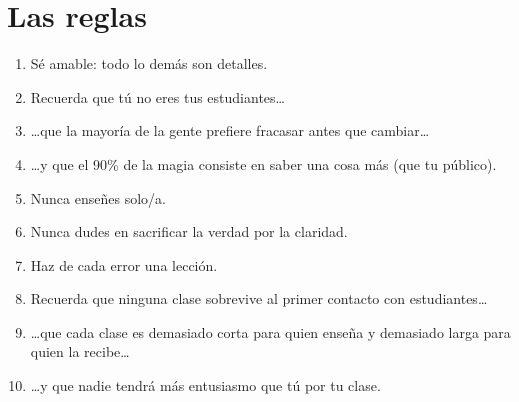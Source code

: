 \chapter*{Las reglas}

\begin{enumerate}

\item Sé amable: todo lo demás son detalles.\\

\item Recuerda que tú no eres tus estudiantes{\ldots}\\

\item {\ldots}que la mayoría de la gente prefiere fracasar antes que cambiar{\ldots}\\

\item {\ldots}y que el 90\% de la magia consiste en saber una cosa más (que tu público).\\

\item Nunca enseñes solo/a.\\

\item Nunca dudes en sacrificar la verdad por la claridad.\\

\item Haz de cada error una lección.\\

\item Recuerda que ninguna clase sobrevive al primer contacto con estudiantes{\ldots}\\

\item {\ldots}que cada clase es demasiado corta para quien enseña y demasiado larga para quien la recibe{\ldots}\\

\item {\ldots}y que nadie tendrá más entusiasmo que tú por tu clase.

\end{enumerate}

